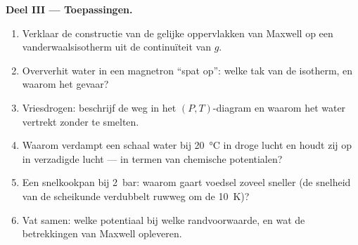 \begin{problem}
\textbf{Deel III --- Toepassingen.}
\begin{enumerate}[resume]
  \item Verklaar de constructie van de gelijke oppervlakken van Maxwell op een
        vanderwaalsisotherm uit de continuïteit van $g$.
  \item Oververhit water in een magnetron ``spat op'': welke tak van de
        isotherm, en waarom het gevaar?
  \item Vriesdrogen: beschrijf de weg in het $(P,T)$-diagram en
        waarom het water vertrekt zonder te smelten.
  \item Waarom verdampt een schaal water bij \qty{20}{\celsius} in droge lucht
        en houdt zij op in verzadigde lucht --- in termen van chemische potentialen?
  \item Een snelkookpan bij \qty{2}{bar}: waarom gaart voedsel zoveel
        sneller (de snelheid van de scheikunde verdubbelt ruwweg om de
        \qty{10}{K})?
  \item Vat samen: welke potentiaal bij welke randvoorwaarde, en wat de
        betrekkingen van Maxwell opleveren.
\end{enumerate}
\end{problem}
